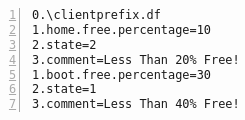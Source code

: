 \documentclass[10pt]{article}
\begin{document}
\begin{Verbatim}[numbers=left,commandchars=\\\{\},numbersep=6pt,fontsize=\small]
0.\clientprefix.df
1.home.free.percentage=10
2.state=2
3.comment=Less Than 20% Free!
1.boot.free.percentage=30
2.state=1
3.comment=Less Than 40% Free!

\end{Verbatim}
\end{document}
